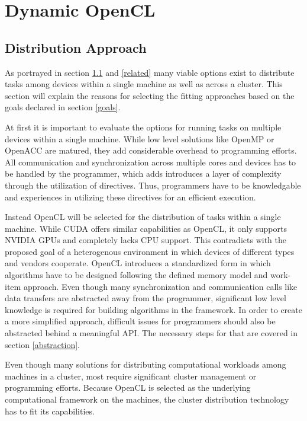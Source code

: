 \chapter{Dynamic OpenCL}

\section{Distribution Approach}
\label{distribution}
As portrayed in section \ref{distribution} and \ref{related} many viable options exist to distribute tasks among devices within a single machine as well as across a cluster. This section will explain the reasons for selecting the fitting approaches based on the goals declared in section \ref{goals}.

At first it is important to evaluate the options for running tasks on multiple devices within a single machine. While low level solutions like OpenMP or OpenACC are matured, they add considerable overhead to programming efforts. All communication and synchronization across multiple cores and devices has to be handled by the programmer, which adds introduces a layer of complexity through the utilization of directives. Thus, programmers have to be knowledgable and experiences in utilizing these directives for an efficient execution.

Instead OpenCL will be selected for the distribution of tasks within a single machine. While CUDA offers similar capabilities as OpenCL, it only supports NVIDIA GPUs and completely lacks CPU support. This contradicts with the proposed goal of a heterogenous environment in which devices of different types and vendors cooperate. OpenCL introduces a standardized form in which algorithms have to be designed following the defined memory model and work-item approach. Even though many synchronization and communication calls like data transfers are abstracted away from the programmer, significant low level knowledge is required for building algorithms in the framework. In order to create a more simplified approach, difficult issues for programmers should also be abstracted behind a meaningful API. The necessary steps for that are covered in section \ref{abstraction}.

Even though many solutions for distributing computational workloads among machines in a cluster, most require significant cluster management or programming efforts. Because OpenCL is selected as the underlying computational framework on the machines, the cluster distribution technology has to fit its capabilities.

